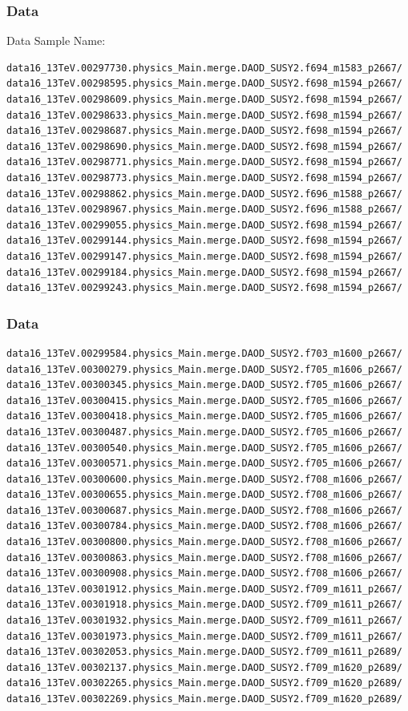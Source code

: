 \documentclass[mathserif,serif]{beamer}
\begin{document}
\begin{frame}[fragile]
\frametitle{Data}
\small
Data Sample Name:
\tiny
\begin{verbatim}
data16_13TeV.00297730.physics_Main.merge.DAOD_SUSY2.f694_m1583_p2667/
data16_13TeV.00298595.physics_Main.merge.DAOD_SUSY2.f698_m1594_p2667/
data16_13TeV.00298609.physics_Main.merge.DAOD_SUSY2.f698_m1594_p2667/
data16_13TeV.00298633.physics_Main.merge.DAOD_SUSY2.f698_m1594_p2667/
data16_13TeV.00298687.physics_Main.merge.DAOD_SUSY2.f698_m1594_p2667/
data16_13TeV.00298690.physics_Main.merge.DAOD_SUSY2.f698_m1594_p2667/
data16_13TeV.00298771.physics_Main.merge.DAOD_SUSY2.f698_m1594_p2667/
data16_13TeV.00298773.physics_Main.merge.DAOD_SUSY2.f698_m1594_p2667/
data16_13TeV.00298862.physics_Main.merge.DAOD_SUSY2.f696_m1588_p2667/
data16_13TeV.00298967.physics_Main.merge.DAOD_SUSY2.f696_m1588_p2667/
data16_13TeV.00299055.physics_Main.merge.DAOD_SUSY2.f698_m1594_p2667/
data16_13TeV.00299144.physics_Main.merge.DAOD_SUSY2.f698_m1594_p2667/
data16_13TeV.00299147.physics_Main.merge.DAOD_SUSY2.f698_m1594_p2667/
data16_13TeV.00299184.physics_Main.merge.DAOD_SUSY2.f698_m1594_p2667/
data16_13TeV.00299243.physics_Main.merge.DAOD_SUSY2.f698_m1594_p2667/
\end{verbatim}
\end{frame}

\begin{frame}[fragile]
\frametitle{Data}
\tiny
\begin{verbatim}
data16_13TeV.00299584.physics_Main.merge.DAOD_SUSY2.f703_m1600_p2667/
data16_13TeV.00300279.physics_Main.merge.DAOD_SUSY2.f705_m1606_p2667/
data16_13TeV.00300345.physics_Main.merge.DAOD_SUSY2.f705_m1606_p2667/
data16_13TeV.00300415.physics_Main.merge.DAOD_SUSY2.f705_m1606_p2667/
data16_13TeV.00300418.physics_Main.merge.DAOD_SUSY2.f705_m1606_p2667/
data16_13TeV.00300487.physics_Main.merge.DAOD_SUSY2.f705_m1606_p2667/
data16_13TeV.00300540.physics_Main.merge.DAOD_SUSY2.f705_m1606_p2667/
data16_13TeV.00300571.physics_Main.merge.DAOD_SUSY2.f705_m1606_p2667/
data16_13TeV.00300600.physics_Main.merge.DAOD_SUSY2.f708_m1606_p2667/
data16_13TeV.00300655.physics_Main.merge.DAOD_SUSY2.f708_m1606_p2667/
data16_13TeV.00300687.physics_Main.merge.DAOD_SUSY2.f708_m1606_p2667/
data16_13TeV.00300784.physics_Main.merge.DAOD_SUSY2.f708_m1606_p2667/
data16_13TeV.00300800.physics_Main.merge.DAOD_SUSY2.f708_m1606_p2667/
data16_13TeV.00300863.physics_Main.merge.DAOD_SUSY2.f708_m1606_p2667/
data16_13TeV.00300908.physics_Main.merge.DAOD_SUSY2.f708_m1606_p2667/
data16_13TeV.00301912.physics_Main.merge.DAOD_SUSY2.f709_m1611_p2667/
data16_13TeV.00301918.physics_Main.merge.DAOD_SUSY2.f709_m1611_p2667/
data16_13TeV.00301932.physics_Main.merge.DAOD_SUSY2.f709_m1611_p2667/
data16_13TeV.00301973.physics_Main.merge.DAOD_SUSY2.f709_m1611_p2667/
data16_13TeV.00302053.physics_Main.merge.DAOD_SUSY2.f709_m1611_p2689/
data16_13TeV.00302137.physics_Main.merge.DAOD_SUSY2.f709_m1620_p2689/
data16_13TeV.00302265.physics_Main.merge.DAOD_SUSY2.f709_m1620_p2689/
data16_13TeV.00302269.physics_Main.merge.DAOD_SUSY2.f709_m1620_p2689/
\end{verbatim}
\end{frame}
\end{document}
